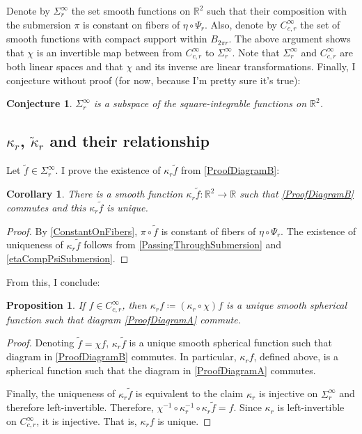 \documentclass[a4paper,11pt]{scrartcl}
\newcounter{dummy}
\numberwithin{dummy}{section}
\theoremstyle{plain}
\newtheorem{proposition}[dummy]{Proposition}
\theoremstyle{plain}
\theoremstyle{plain}
\newtheorem{conjecture}[dummy]{Conjecture}
\theoremstyle{plain}
\newtheorem{corollary}[dummy]{Corollary}
\theoremstyle{nonumberplain}
\newtheorem{proof}{Proof}
\newcommand{\F}[1][R]{\mathbb{#1}} %
\begin{document}
	Denote by $ \Sigma_{r}^{\infty} $ the set smooth functions on $ \F^{2} $ such that their composition with the submersion $ \pi $ is  constant on fibers of $ \eta \circ \Psi_{r} $. Also, denote by $ C_{c,r}^{\infty} $ the set of smooth functions with compact support within $ B_{2 \pi r} $. The above argument shows that $ \chi $ is an invertible map between from $ C_{c,r}^{\infty} $ to $ \Sigma_{r}^{\infty} $. Note that $ \Sigma_{r}^{\infty} $ and $ C_{c,r}^{\infty} $ are both linear spaces and that $ \chi $ and its inverse are linear transformations. Finally, I conjecture without proof (for now, because I'm pretty sure it's true):
	\begin{conjecture}
		$ \Sigma_{r}^{\infty} $ is a subspace of the square-integrable functions on $ \F^{2} $.
	\end{conjecture}
	
	\subsection{$ \kappa_{r} $, $ \widetilde{\kappa}_{r} $ and their relationship}
	Let $ \widetilde{f} \in \Sigma_{r}^{\infty} $. I prove the existence of $ \kappa_{r} \widetilde{f} $ from \autoref{ProofDiagramB}:
	\begin{corollary}
		\label{ExistAndUniqueKappa}
		There is a smooth function $ \kappa_{r} \widetilde{f} : \F^{2} \to \F $ such that \autoref{ProofDiagramB} commutes and this $ \kappa_{r} \widetilde{f} $ is unique.
	\end{corollary}
	
	\begin{proof}
		By \cref{ConstantOnFibers}, $ \pi \circ \widetilde{f} $ is constant of fibers of $ \eta \circ \Psi_{r} $. The existence of uniqueness of $ \kappa_{r} \widetilde{f} $ follows from \cref{PassingThroughSubmersion} and \cref{etaCompPsiSubmersion}.
	\end{proof}
	
	From this, I conclude:
	\begin{proposition}
		If $ f \in C_{c,r}^{\infty} $, then $ \kappa_{r} f \coloneqq (\kappa_{r} \circ \chi) f $ is a unique smooth spherical function such that diagram \autoref{ProofDiagramA} commute.
	\end{proposition}
	
	\begin{proof}
		Denoting $ \widetilde{f} = \chi f $, $ \kappa_{r} \widetilde{f} $ is a unique smooth spherical function such that diagram in \autoref{ProofDiagramB} commutes. In particular, $ \kappa_{r} f $, defined above,  is a spherical function such that the diagram in \autoref{ProofDiagramA} commutes. 
		
		Finally, the uniqueness of $ \kappa_{r} \widetilde{f} $ is equivalent to the claim $ \kappa_{r} $ is injective on $ \Sigma_{r}^{\infty} $ and therefore left-invertible. Therefore, $ \chi^{-1} \circ \kappa_{r}^{-1} \circ \kappa_{r} \widetilde{f} = f  $. Since $ \kappa_{r} $ is left-invertible on $ C_{c,r}^{\infty}$, it is injective. That is, $ \kappa_{r} f $ is unique.
	\end{proof}
	
\end{document}
